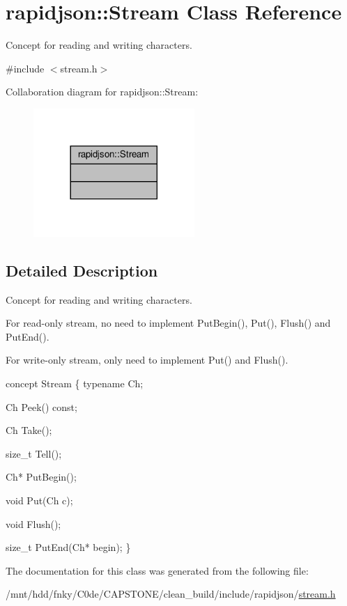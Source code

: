 \hypertarget{classrapidjson_1_1Stream}{}\section{rapidjson\+:\+:Stream Class Reference}
\label{classrapidjson_1_1Stream}


Concept for reading and writing characters.  




{\ttfamily \#include $<$stream.\+h$>$}



Collaboration diagram for rapidjson\+:\+:Stream\+:
\nopagebreak
\begin{figure}[H]
\begin{center}
\leavevmode
\includegraphics[width=173pt]{classrapidjson_1_1Stream__coll__graph}
\end{center}
\end{figure}


\subsection{Detailed Description}
Concept for reading and writing characters. 

For read-\/only stream, no need to implement Put\+Begin(), Put(), Flush() and Put\+End().

For write-\/only stream, only need to implement Put() and Flush().


\begin{DoxyCode}
concept Stream \{
    \textcolor{keyword}{typename} Ch;    

    Ch Peek() \textcolor{keyword}{const};

    Ch Take();

    \textcolor{keywordtype}{size\_t} Tell();

    Ch* PutBegin();

    \textcolor{keywordtype}{void} Put(Ch c);

    \textcolor{keywordtype}{void} Flush();

    \textcolor{keywordtype}{size\_t} PutEnd(Ch* begin);
\}
\end{DoxyCode}
 

The documentation for this class was generated from the following file\+:\begin{DoxyCompactItemize}
\item 
/mnt/hdd/fnky/\+C0de/\+C\+A\+P\+S\+T\+O\+N\+E/clean\+\_\+build/include/rapidjson/\hyperlink{stream_8h}{stream.\+h}\end{DoxyCompactItemize}
